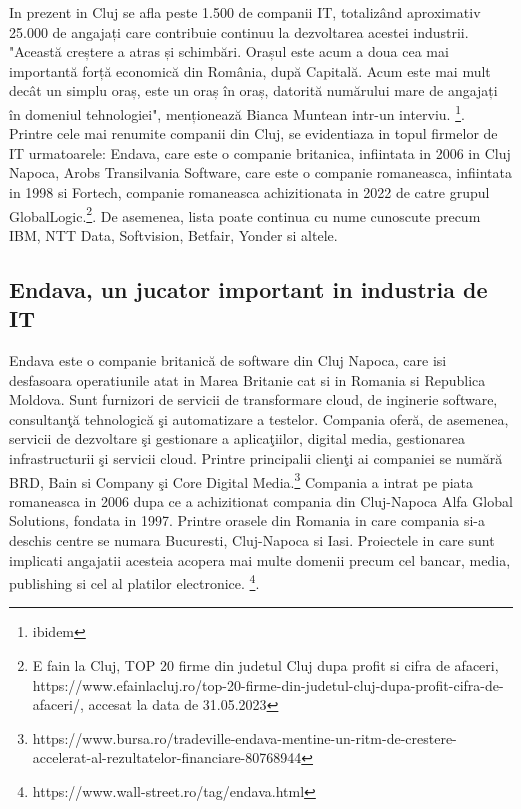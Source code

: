 \documentclass[a4paper, 12pt]{article}
\begin{document}
	\quad \quad In prezent in Cluj se afla peste 1.500 de companii IT, totalizând aproximativ 25.000 de angajați care contribuie continuu la dezvoltarea acestei industrii. "Această creștere a atras și schimbări. Orașul este acum a doua cea mai importantă forță economică din România, după Capitală. Acum este mai mult decât un simplu oraș, este un oraș în oraș, datorită numărului mare de angajați în domeniul tehnologiei", menționează Bianca Muntean intr-un interviu. \footnote{ibidem}. Printre cele mai renumite companii din Cluj, se evidentiaza in topul firmelor de IT urmatoarele: Endava, care este o companie britanica, infiintata in 2006 in Cluj Napoca, Arobs Transilvania Software, care este o companie romaneasca, infiintata in 1998 si Fortech, companie romaneasca achizitionata in 2022 de catre grupul GlobalLogic.\footnote{E fain la Cluj, TOP 20 firme din judetul Cluj dupa profit si cifra de afaceri, https://www.efainlacluj.ro/top-20-firme-din-judetul-cluj-dupa-profit-cifra-de-afaceri/, accesat la data de 31.05.2023}. De asemenea, lista poate continua cu nume cunoscute precum IBM, NTT Data, Softvision, Betfair, Yonder si altele.




	\subsection {Endava, un jucator important in industria de IT}

	\quad\quad Endava este o companie britanică de software din Cluj Napoca, care isi  desfasoara operatiunile atat in Marea Britanie cat si in Romania si Republica Moldova. Sunt furnizori de servicii de transformare cloud, de inginerie software, consultanţă tehnologică şi automatizare a testelor. Compania oferă, de asemenea, servicii de dezvoltare şi gestionare a aplicaţiilor, digital media, gestionarea infrastructurii şi servicii cloud. Printre principalii clienţi ai companiei se numără BRD, Bain si Company şi Core Digital Media.\footnote{https://www.bursa.ro/tradeville-endava-mentine-un-ritm-de-crestere-accelerat-al-rezultatelor-financiare-80768944} Compania a intrat pe piata romaneasca in 2006 dupa ce a achizitionat compania din Cluj-Napoca Alfa Global Solutions, fondata in 1997. Printre orasele din Romania in care compania si-a deschis centre se numara Bucuresti, Cluj-Napoca si Iasi. Proiectele in care sunt implicati angajatii acesteia acopera mai multe domenii precum cel bancar, media, publishing si cel al platilor electronice. \footnote{https://www.wall-street.ro/tag/endava.html}.
\end{document}

